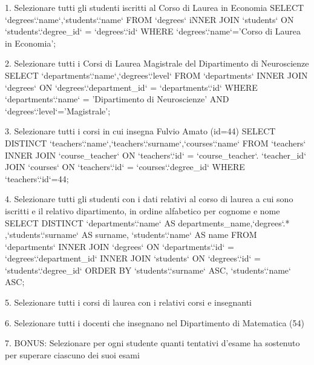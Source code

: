 1. Selezionare tutti gli studenti iscritti al Corso di Laurea in Economia
SELECT `degrees`.`name`,`students`.`name` FROM `degrees` iNNER JOIN `students` ON `students`.`degree_id` = `degrees`.`id` WHERE `degrees`.`name`='Corso di Laurea in Economia';


2. Selezionare tutti i Corsi di Laurea Magistrale del Dipartimento di Neuroscienze
SELECT `departments`.`name`,`degrees`.`level` FROM `departments` INNER JOIN `degrees` ON `degrees`.`department_id` = `departments`.`id` WHERE `departments`.`name` = 'Dipartimento di Neuroscienze' AND `degrees`.`level`='Magistrale';

3. Selezionare tutti i corsi in cui insegna Fulvio Amato (id=44)
SELECT DISTINCT `teachers`.`name`,`teachers`.`surname`,`courses`.`name` FROM `teachers` INNER JOIN `course_teacher` ON `teachers`.`id` = `course_teacher`. `teacher_id` JOIN `courses` ON `teachers`.`id` = `courses`.`degree_id` WHERE `teachers`.`id`=44;

4. Selezionare tutti gli studenti con i dati relativi al corso di laurea a cui sono iscritti e il
relativo dipartimento, in ordine alfabetico per cognome e nome
SELECT DISTINCT `departments`.`name` AS departments_name,`degrees`.* ,`students`.`surname` AS surname, `students`.`name` AS name FROM `departments` INNER JOIN `degrees` ON `departments`.`id` = `degrees`.`department_id` INNER JOIN `students` ON `degrees`.`id` = `students`.`degree_id` ORDER BY `students`.`surname` ASC, `students`.`name` ASC;

5. Selezionare tutti i corsi di laurea con i relativi corsi e insegnanti



6. Selezionare tutti i docenti che insegnano nel Dipartimento di Matematica (54)


7. BONUS: Selezionare per ogni studente quanti tentativi d’esame ha sostenuto per
superare ciascuno dei suoi esami